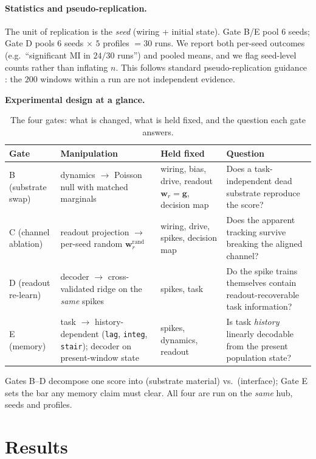 \documentclass[10pt,a4paper]{article}
\begin{document}
\paragraph{Statistics and pseudo-replication.} The unit of replication
is the \emph{seed} (wiring + initial state). Gate B/E pool $6$ seeds;
Gate D pools $6$ seeds $\times$ $5$ profiles $=30$ runs. We report both
per-seed outcomes (e.g.\ ``significant MI in $24/30$ runs'') and pooled
means, and we flag seed-level counts rather than inflating $n$. This
follows standard pseudo-replication guidance \cite{hurlbert1984}: the
$200$ windows within a run are not independent evidence.

\noindent
\textbf{Experimental design at a glance.}
\begin{table}[H]
\centering
\caption{The four gates: what is changed, what is held fixed, and the
question each gate answers.}
\label{tab:design}
\small
\begin{tabular}{@{}p{5.5em}p{12em}p{11.5em}p{16em}@{}}
\toprule
\textbf{Gate} & \textbf{Manipulation} & \textbf{Held fixed} &
\textbf{Question} \\
\midrule
B (substrate
swap) & dynamics $\to$ Poisson
null with matched marginals
& wiring, bias, drive,
readout $\mathbf{w}_r=\mathbf{g}$, decision map
& Does a task-independent
dead substrate reproduce
the score? \\
C (channel
ablation) & readout projection
$\to$ per-seed random $\mathbf{w}_r^{\mathrm{rand}}$
& wiring, drive, spikes,
decision map
& Does the apparent tracking
survive breaking the aligned
channel? \\
D (readout
re-learn) & decoder $\to$ cross-validated ridge on
the \emph{same} spikes
& spikes, task
& Do the spike trains themselves
contain readout-recoverable task
information? \\
E (memory) & task $\to$ history-dependent
(\texttt{lag}, \texttt{integ},
\texttt{stair}); decoder on
present-window state
& spikes, dynamics, readout
& Is task \emph{history} linearly
decodable from the present
population state? \\
\bottomrule
\end{tabular}
\end{table}
Gates B--D decompose one score into (substrate material) vs.\
(interface); Gate E sets the bar any memory claim must clear. All four
are run on the \emph{same} hub, seeds and profiles.

\section{Results}\label{sec:results}
\end{document}
